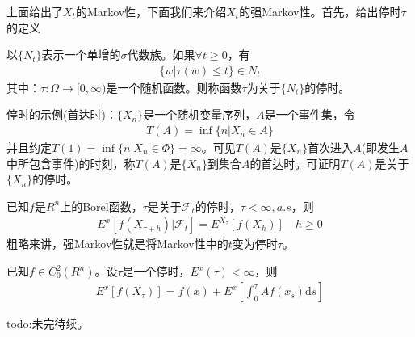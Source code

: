         上面给出了$X_t$的Markov性，下面我们来介绍$X_t$的强Markov性。首先，给出停时$\tau$的定义
        \begin{definition}[停时]
            以$\{N_t\}$表示一个单增的$\sigma$代数族。如果$\forall t \geqslant 0$，有
            \begin{align*}
                \{w|\tau(w) \leqslant t\} \in N_t
            \end{align*}
            其中：$\tau:\Omega \rightarrow [0,\infty)$是一个随机函数。则称函数$\tau$为关于$\{N_t\}$的停时。
        \end{definition}
        \par
        停时的示例(首达时)：$\{X_n\}$是一个随机变量序列，$A$是一个事件集，令
        \begin{align*}
            T(A) = \inf\{n|X_n\in A\}
        \end{align*}
        并且约定$T(1) = \inf\{n|X_n \in \varPhi \} = \infty$。可见$T(A)$是$\{X_n\}$首次进入$A$(即发生$A$中所包含事件)的时刻，称$T(A)$是$\{X_n\}$到集合$A$的首达时。可证明$T(A)$是关于$\{X_n\}$的停时。
        \begin{theorem}[Ito分布的强Markov性]
            已知$f$是$R^n$上的Borel函数，$\tau$是关于$\mathcal{F}_t$的停时，$\tau < \infty,a.s$，则
            \begin{align*}
            E^x\left[f(X_{\tau+h})|\mathcal{F}_t\right] = E^{X_{\tau}}[f(X_h)]\quad h \geqslant0
            \end{align*}
            粗略来讲，强Markov性就是将Markov性中的$t$变为停时$\tau$。
        \end{theorem}
        \begin{theorem}[Dynkin公式]
            已知$f\in C_0^2(R^n)$。设$\tau$是一个停时，$E^x(\tau) < \infty$，则
            \begin{align*}
            E^x[f(X_{\tau})] = f(x) + E^x\left[\int_0^{\tau}Af(x_s)\mathrm{d}s\right]
            \end{align*}
        \end{theorem}
        \textcolor[rgb]{1 0 0}{todo:未完待续。}

